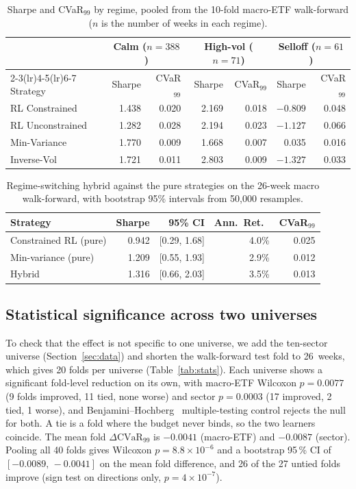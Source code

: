 \documentclass[sigconf]{acmart}
\begin{document}
\begin{table}[t]
\centering
\caption{Sharpe and CVaR$_{99}$ by regime, pooled from the 10-fold macro-ETF walk-forward ($n$ is the number of weeks in each regime).}
\label{tab:regime}
\footnotesize
\setlength{\tabcolsep}{2pt}
\begin{tabular}{lrrrrrr}
\toprule
 & \multicolumn{2}{c}{Calm ($n{=}388$)} & \multicolumn{2}{c}{High-vol ($n{=}71$)} & \multicolumn{2}{c}{Selloff ($n{=}61$)} \\
\cmidrule(lr){2-3}\cmidrule(lr){4-5}\cmidrule(lr){6-7}
Strategy & Sharpe & CVaR$_{99}$ & Sharpe & CVaR$_{99}$ & Sharpe & CVaR$_{99}$ \\
\midrule
RL Constrained   & 1.438 & 0.020 & 2.169 & 0.018 & $-0.809$ & 0.048 \\
RL Unconstrained & 1.282 & 0.028 & 2.194 & 0.023 & $-1.127$ & 0.066 \\
Min-Variance     & 1.770 & 0.009 & 1.668 & 0.007 & 0.035 & 0.016 \\
Inverse-Vol      & 1.721 & 0.011 & 2.803 & 0.009 & $-1.327$ & 0.033 \\
\bottomrule
\end{tabular}
\end{table}

\begin{table}[t]
\centering
\caption{Regime-switching hybrid against the pure strategies on the 26-week macro walk-forward, with bootstrap 95\% intervals from 50{,}000 resamples.}
\label{tab:hybrid}
\footnotesize
\begin{tabular}{lrrrr}
\toprule
Strategy & Sharpe & 95\% CI & Ann.\ Ret.\ & CVaR$_{99}$ \\
\midrule
Constrained RL (pure) & 0.942 & [0.29, 1.68] & 4.0\% & 0.025 \\
Min-variance (pure)   & 1.209 & [0.55, 1.93] & 2.9\% & 0.012 \\
Hybrid       & 1.316 & [0.66, 2.03] & 3.5\% & 0.013 \\
\bottomrule
\end{tabular}
\end{table}

\subsection{Statistical significance across two universes}
\label{sec:significance}
To check that the effect is not specific to one universe, we add the ten-sector universe
(Section~\ref{sec:data}) and shorten the walk-forward test fold to 26~weeks, which gives 20
folds per universe (Table~\ref{tab:stats}). Each universe shows a significant
fold-level reduction on its own, with macro-ETF Wilcoxon $p=0.0077$ (9 folds improved, 11 tied,
none worse) and sector $p=0.0003$ (17 improved, 2 tied, 1 worse), and
Benjamini--Hochberg~\cite{benjamini1995fdr} multiple-testing control rejects the null for
both. A tie is a fold
where the budget never binds, so the two learners coincide. The mean fold
$\Delta\mathrm{CVaR}_{99}$ is $-0.0041$ (macro-ETF) and $-0.0087$ (sector). Pooling all 40 folds
gives Wilcoxon $p=8.8\times10^{-6}$ and a bootstrap 95\,\% CI of $[-0.0089,\,-0.0041]$ on the
mean fold difference, and 26 of the 27 untied folds improve (sign test on directions only,
$p=4\times10^{-7}$).
\end{document}
